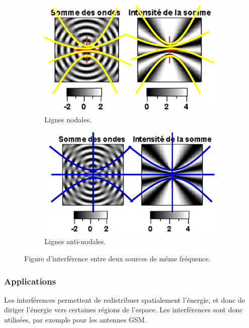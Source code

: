 \begin{figure}[ht]
	\centering
	\begin{subfigure}[b]{0.45\textwidth}
		\includegraphics[scale=0.8]{img/fig_interferences_nodales.png}
		\caption{Lignes nodales.}
		\label{fig:nodale}
	\end{subfigure}
	\begin{subfigure}[b]{0.45\textwidth}
		\includegraphics[scale=0.8]{img/fig_interferences_antinodales.png}
	\caption{Lignes anti-nodales.}
	\label{fig:antinodale}
	\end{subfigure}
	\caption{Figure d'interférence entre deux sources de même fréquence.}
\end{figure}

\subsubsection{Applications}
Les interférences permettent de redistribuer spatialement l'énergie,
et donc de diriger l'énergie vers certaines régions de l'espace.
Les interférences sont donc utilisées, par exemple pour les antennes
GSM.

